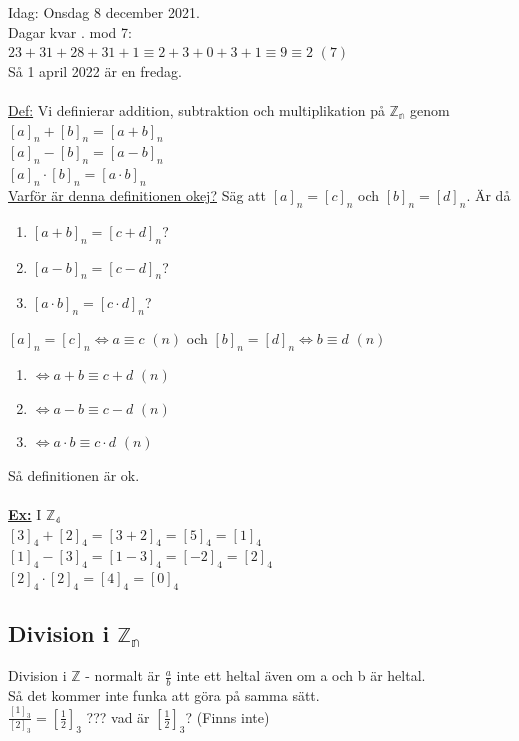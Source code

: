 \documentclass{article}
\begin{document}
    Idag: Onsdag 8 december 2021.\\
    Dagar kvar . mod 7:\\
    $23+31+28+31+1\equiv 2+3+0+3+1\equiv 9\equiv 2$ $(7)$\\
    Så 1 april 2022 är en fredag.\\\\
    \underline{Def:} Vi definierar addition, subtraktion och multiplikation på $\mathbb{Z_{n}}$ genom\\
    $[a]_{n}+[b]_{n}=[a+b]_{n}$\\
    $[a]_{n}-[b]_{n}=[a-b]_{n}$\\
    $[a]_{n}\cdot [b]_{n}=[a\cdot b]_{n}$\\
    \underline{Varför är denna definitionen okej?}
    Säg att $[a]_{n}=[c]_{n}$ och $[b]_{n}=[d]_{n}$. Är då\\
    \begin{enumerate}
        \item $[a+b]_{n}=[c+d]_{n}$?
        \item $[a-b]_{n}=[c-d]_{n}$?
        \item $[a\cdot b]_{n}=[c\cdot d]_{n}$?
    \end{enumerate}
    $[a]_{n}=[c]_{n}\Leftrightarrow a\equiv c$ $(n)$ och $[b]_{n}=[d]_{n}\Leftrightarrow b\equiv d$ $(n)$\\
    \begin{enumerate}
        \item $\Leftrightarrow a+b\equiv c+d$ $(n)$
        \item $\Leftrightarrow a-b\equiv c-d$ $(n)$
        \item $\Leftrightarrow a\cdot b\equiv c\cdot d$ $(n)$
    \end{enumerate}
    Så definitionen är ok.\\\\
    \underline{\textbf{Ex:}} I $\mathbb{Z_{4}}$\\
    \indent $[3]_{4}+[2]_{4}=[3+2]_{4}=[5]_{4}=[1]_{4}$\\
    \indent $[1]_{4}-[3]_{4}=[1-3]_{4}=[-2]_{4}=[2]_{4}$\\
    \indent $[2]_{4}\cdot [2]_{4}=[4]_{4}=[0]_{4}$
    \subsection{Division i $\mathbb{Z_{n}}$}
    Division i $\mathbb{Z}$ - normalt är $\frac{a}{b}$ inte ett heltal även om a och b är heltal.\\
    Så det kommer inte funka att göra på samma sätt.\\
    $\frac{[1]_{3}}{[2]_{3}}=[\frac{1}{2}]_{3}$ ??? vad är $[\frac{1}{2}]_{3}$? (Finns inte)
\end{document}
